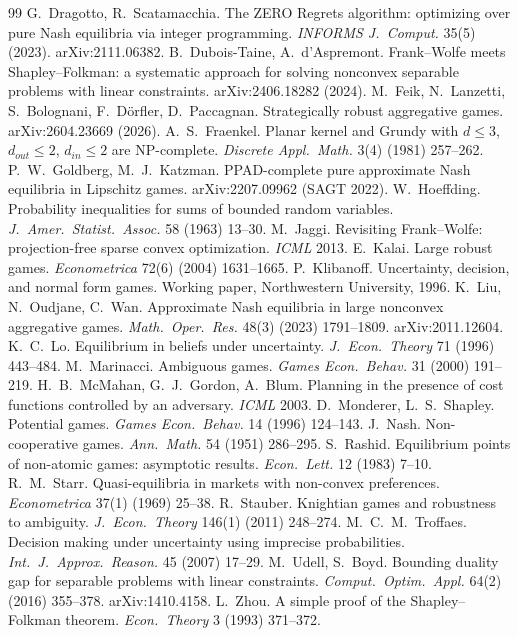 \documentclass[11pt]{article}
\theoremstyle{definition}
\theoremstyle{remark}
\begin{document}
\begin{thebibliography}{99}
 G.~Dragotto, R.~Scatamacchia. The ZERO Regrets algorithm: optimizing over pure Nash equilibria via integer programming. \emph{INFORMS J.\ Comput.} 35(5) (2023). arXiv:2111.06382.
 B.~Dubois-Taine, A.~d'Aspremont. Frank--Wolfe meets Shapley--Folkman: a systematic approach for solving nonconvex separable problems with linear constraints. arXiv:2406.18282 (2024).
 M.~Feik, N.~Lanzetti, S.~Bolognani, F.~Dörfler, D.~Paccagnan. Strategically robust aggregative games. arXiv:2604.23669 (2026).
 A.~S.~Fraenkel. Planar kernel and Grundy with $d\le3$, $d_{out}\le2$, $d_{in}\le2$ are NP-complete. \emph{Discrete Appl.\ Math.} 3(4) (1981) 257--262.
 P.~W.~Goldberg, M.~J.~Katzman. PPAD-complete pure approximate Nash equilibria in Lipschitz games. arXiv:2207.09962 (SAGT 2022).
 W.~Hoeffding. Probability inequalities for sums of bounded random variables. \emph{J.\ Amer.\ Statist.\ Assoc.} 58 (1963) 13--30.
 M.~Jaggi. Revisiting Frank--Wolfe: projection-free sparse convex optimization. \emph{ICML} 2013.
 E.~Kalai. Large robust games. \emph{Econometrica} 72(6) (2004) 1631--1665.
 P.~Klibanoff. Uncertainty, decision, and normal form games. Working paper, Northwestern University, 1996.
 K.~Liu, N.~Oudjane, C.~Wan. Approximate Nash equilibria in large nonconvex aggregative games. \emph{Math.\ Oper.\ Res.} 48(3) (2023) 1791--1809. arXiv:2011.12604.
 K.~C.~Lo. Equilibrium in beliefs under uncertainty. \emph{J.\ Econ.\ Theory} 71 (1996) 443--484.
 M.~Marinacci. Ambiguous games. \emph{Games Econ.\ Behav.} 31 (2000) 191--219.
 H.~B.~McMahan, G.~J.~Gordon, A.~Blum. Planning in the presence of cost functions controlled by an adversary. \emph{ICML} 2003.
 D.~Monderer, L.~S.~Shapley. Potential games. \emph{Games Econ.\ Behav.} 14 (1996) 124--143.
 J.~Nash. Non-cooperative games. \emph{Ann.\ Math.} 54 (1951) 286--295.
 S.~Rashid. Equilibrium points of non-atomic games: asymptotic results. \emph{Econ.\ Lett.} 12 (1983) 7--10.
 R.~M.~Starr. Quasi-equilibria in markets with non-convex preferences. \emph{Econometrica} 37(1) (1969) 25--38.
 R.~Stauber. Knightian games and robustness to ambiguity. \emph{J.\ Econ.\ Theory} 146(1) (2011) 248--274.
 M.~C.~M.~Troffaes. Decision making under uncertainty using imprecise probabilities. \emph{Int.\ J.\ Approx.\ Reason.} 45 (2007) 17--29.
 M.~Udell, S.~Boyd. Bounding duality gap for separable problems with linear constraints. \emph{Comput.\ Optim.\ Appl.} 64(2) (2016) 355--378. arXiv:1410.4158.
 L.~Zhou. A simple proof of the Shapley--Folkman theorem. \emph{Econ.\ Theory} 3 (1993) 371--372.
\end{thebibliography}
\end{document}
